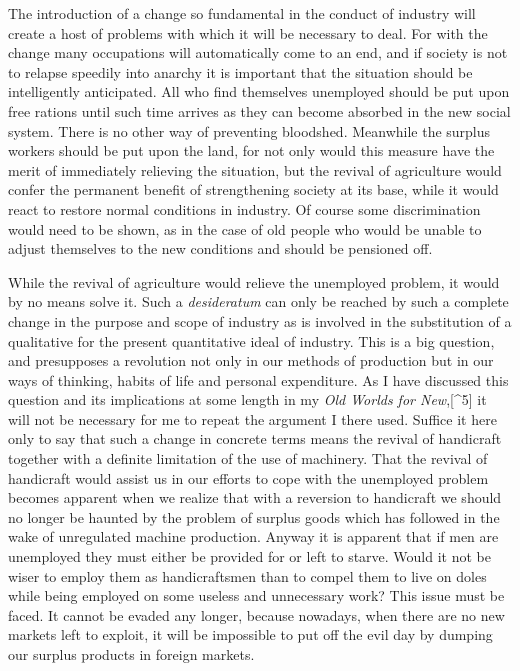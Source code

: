 \documentclass{book}
\begin{document}
The introduction of a change so fundamental in the conduct of industry will create a host of problems with which it will be necessary to deal. For with the change many occupations will automatically come to an end, and if society is not to relapse speedily into anarchy it is important that the situation should be intelligently anticipated. All who find themselves unemployed should be put upon free rations until such time arrives as they can become absorbed in the new social system. There is no other way of preventing bloodshed. Meanwhile the surplus workers should be put upon the land, for not only would this measure have the merit of immediately relieving the situation, but the revival of agriculture would confer the permanent benefit of strengthening society at its base, while it would react to restore normal conditions in industry. Of course some discrimination would need to be shown, as in the case of old people who would be unable to adjust themselves to the new conditions and should be pensioned off.

While the revival of agriculture would relieve the unemployed problem, it would by no means solve it. Such a \emph{desideratum} can only be reached by such a complete change in the purpose and scope of industry as is involved in the substitution of a qualitative for the present quantitative ideal of industry. This is a big question, and presupposes a revolution not only in our methods of production but in our ways of thinking, habits of life and personal expenditure. As I have discussed this question and its implications at some length in my \emph{Old Worlds for New},{[}\textasciicircum{}5{]} it will not be necessary for me to repeat the argument I there used. Suffice it here only to say that such a change in concrete terms means the revival of handicraft together with a definite limitation of the use of machinery. That the revival of handicraft would assist us in our efforts to cope with the unemployed problem becomes apparent when we realize that with a reversion to handicraft we should no longer be haunted by the problem of surplus goods which has followed in the wake of unregulated machine production. Anyway it is apparent that if men are unemployed they must either be provided for or left to starve. Would it not be wiser to employ them as handicraftsmen than to compel them to live on doles while being employed on some useless and unnecessary work? This issue must be faced. It cannot be evaded any longer, because nowadays, when there are no new markets left to exploit, it will be impossible to put off the evil day by dumping our surplus products in foreign markets.
\end{document}
